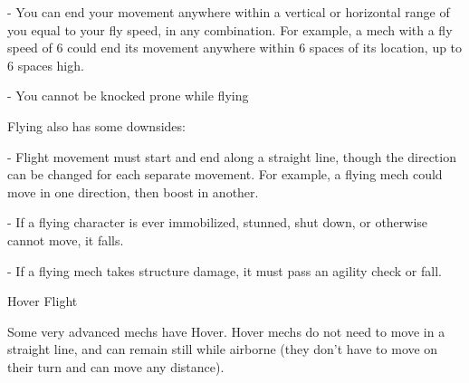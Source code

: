     -    You can end your movement anywhere within a vertical or horizontal range of you equal  
         to your fly speed, in any combination. For example, a mech with a fly speed of 6 could  
         end its movement anywhere within 6 spaces of its location, up to 6 spaces high.
 
    -    You cannot be knocked prone while flying
 

Flying also has some downsides:
 
             -    Flight movement must start and end along a straight line, though the direction  
                 can be changed for each separate movement. For example, a flying mech could  
                  move in one direction, then boost in another. 
 
             -    If a flying character is ever immobilized, stunned, shut down, or otherwise cannot  
                  move, it falls.
 
             -    If a flying mech takes structure damage, it must pass an agility check or fall.
 

                                                  Hover Flight  

Some very advanced mechs have Hover. Hover mechs do not need to move in a straight line,  
and can remain still while airborne (they don’t have to move on their turn and can move any  
distance).
 
